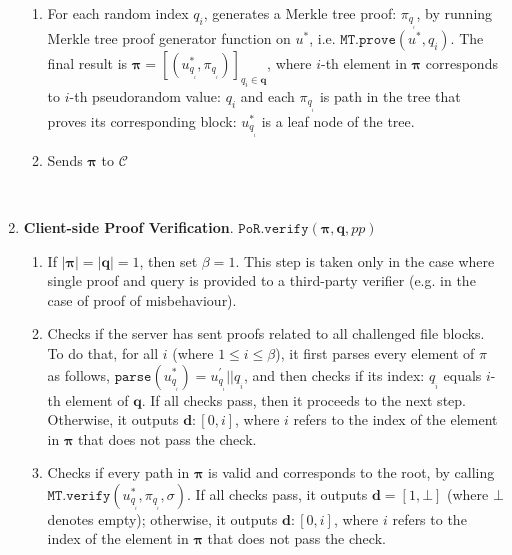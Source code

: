 \begin{enumerate}
\begin{enumerate}
\item For each random index $q_{\scriptscriptstyle i}$, generates a Merkle tree proof: $\pi_{\scriptscriptstyle{q_{_{\scriptscriptstyle i}}}}$, by  running Merkle tree proof generator function on $u^{\scriptscriptstyle *}$, i.e. $\mathtt{MT.prove}(u^{*},q_{\scriptscriptstyle i})$. The final result  is $ {\bm{\pi}}=[(u^{\scriptscriptstyle *}_{\scriptscriptstyle q_{_{\scriptscriptstyle i}}},\pi_{\scriptscriptstyle q_{_{\scriptscriptstyle i}}})]_{\scriptscriptstyle q_{\scriptscriptstyle i}\in {\bm{q}}}$, where $i$-th element in $ {\bm{\pi}}$ corresponds to $i$-th pseudorandom value: $q_{\scriptscriptstyle i}$ and   each $\pi_{\scriptscriptstyle{q_{_{\scriptscriptstyle i}}}}$ is path in the tree that proves its corresponding block: $u^{\scriptscriptstyle *}_{\scriptscriptstyle q_{_{\scriptscriptstyle i}}}$ is a leaf node of the  tree. 

\item Sends $ {\bm{\pi}}$ to $\mathcal{C}$
 \end{enumerate}
 
 \
 
\item\label{PoR-verify}\textbf{Client-side Proof Verification}. $\mathtt{PoR.verify}( {\bm{\pi}},\bm{q},pp)$ 
\begin{enumerate}

\item If $|\bm{\pi}|=|\bm{q}|=1$, then set $\beta=1$. This step is taken only in the case where single proof and query is provided to a third-party verifier (e.g. in the case of proof of misbehaviour). 
\item Checks if the server has sent proofs related to all challenged file blocks. To do that, for all $i$ (where $1\leq i\leq \beta$),  it first parses every  element of $\pi$ as follows, $\mathtt{parse}(u^{\scriptscriptstyle *}_{\scriptscriptstyle q_{_{\scriptscriptstyle i}}})=u^{\scriptscriptstyle '}_{\scriptscriptstyle q_{_{\scriptscriptstyle i}}}||q_{_{\scriptscriptstyle i}}$, and then checks if its index: $q_{_{\scriptscriptstyle i}}$ equals $i$-th element of $ {\bm{q}}$. If all checks pass, then it proceeds to the next step. Otherwise,  it outputs $ {\bm{d}}:[0,i]$, where $i$ refers to the index of the  element in $ {\bm{\pi}}$ that does not pass the check. 


\item Checks if every path in  $ {\bm{\pi}}$ is valid and corresponds to the root, by calling $\mathtt{MT.verify}(u^{\scriptscriptstyle *}_{\scriptscriptstyle q_{_{\scriptscriptstyle i}}},\pi_{\scriptscriptstyle q_{_{\scriptscriptstyle i}}},\sigma)$. If all checks pass, it outputs $ {\bm{d}}=[1,\bot]$ (where $\bot$ denotes empty); otherwise, it outputs $ {\bm{d}}:[0,i]$, where $i$ refers to the index of the  element in $ {\bm{\pi}}$ that does not pass the check. 
\end{enumerate}
\end{enumerate}
